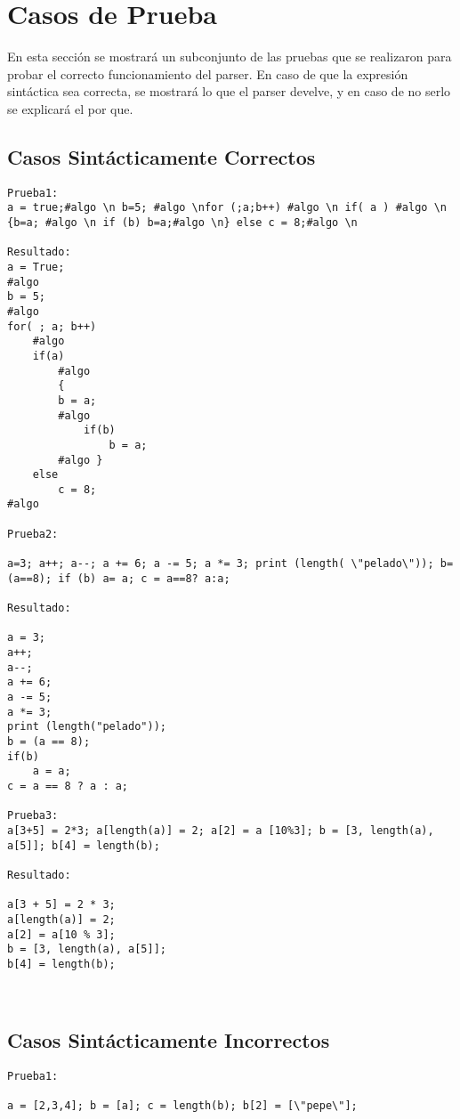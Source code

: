 \section{Casos de Prueba}

En esta sección se mostrará un subconjunto de las pruebas que se realizaron para probar el correcto funcionamiento del parser. En caso de que la expresión sintáctica sea correcta, se mostrará lo que el parser develve, y en caso de no serlo se explicará el por que.

\subsection{Casos Sintácticamente Correctos}

\begin{verbatim}
Prueba1:
a = true;#algo \n b=5; #algo \nfor (;a;b++) #algo \n if( a ) #algo \n {b=a; #algo \n if (b) b=a;#algo \n} else c = 8;#algo \n

Resultado:
a = True;
#algo 
b = 5;
#algo 
for( ; a; b++)
	#algo 
	if(a)
		#algo 
		{
		b = a;
		#algo 
			if(b)
				b = a;
		#algo }
	else
		c = 8;
#algo 

Prueba2:

a=3; a++; a--; a += 6; a -= 5; a *= 3; print (length( \"pelado\")); b= (a==8); if (b) a= a; c = a==8? a:a;

Resultado:

a = 3;
a++;
a--;
a += 6;
a -= 5;
a *= 3;
print (length("pelado"));
b = (a == 8);
if(b)
	a = a;
c = a == 8 ? a : a;

Prueba3:
a[3+5] = 2*3; a[length(a)] = 2; a[2] = a [10%3]; b = [3, length(a), a[5]]; b[4] = length(b);

Resultado:

a[3 + 5] = 2 * 3;
a[length(a)] = 2;
a[2] = a[10 % 3];
b = [3, length(a), a[5]];
b[4] = length(b);



\end{verbatim}

\subsection{Casos Sintácticamente Incorrectos}

\begin{verbatim}
Prueba1:

a = [2,3,4]; b = [a]; c = length(b); b[2] = [\"pepe\"];

\end{verbatim}

